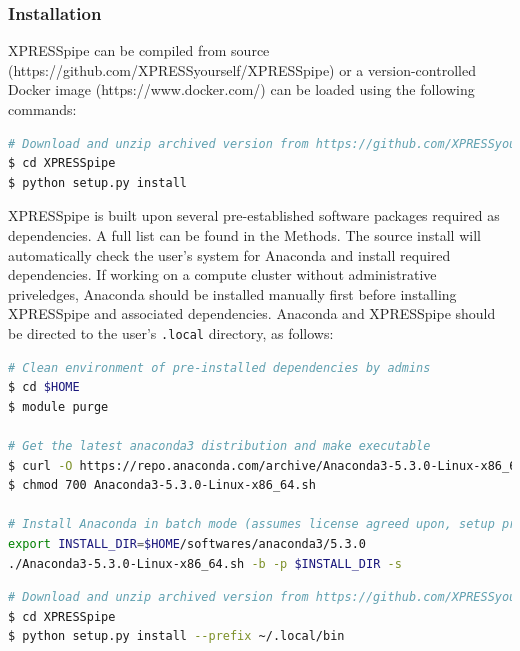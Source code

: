 \documentclass[11pt, a4paper, oneside]{article}
\begin{document}
\newline

\subsubsection{Installation}
XPRESSpipe can be compiled from source (https://github.com/XPRESSyourself/XPRESSpipe) or a version-controlled Docker image (https://www.docker.com/) can be loaded using the following commands: \par

\begin{lstlisting}[language=bash, caption=Source installation.]
# Download and unzip archived version from https://github.com/XPRESSyourself/XPRESSpipe/releases
$ cd XPRESSpipe
$ python setup.py install
\end{lstlisting}

XPRESSpipe is built upon several pre-established software packages required as dependencies. A full list can be found in the Methods. The source install will automatically check the user's system for Anaconda\cite{anaconda} and install required dependencies. If working on a compute cluster without administrative priveledges, Anaconda should be installed manually first before installing XPRESSpipe and associated dependencies. Anaconda and XPRESSpipe should be directed to the user's \texttt{.local} directory, as follows:

\begin{lstlisting}[language=bash, caption=Anaconda installation on compute node.]
# Clean environment of pre-installed dependencies by admins
$ cd $HOME
$ module purge

# Get the latest anaconda3 distribution and make executable
$ curl -O https://repo.anaconda.com/archive/Anaconda3-5.3.0-Linux-x86_64.sh
$ chmod 700 Anaconda3-5.3.0-Linux-x86_64.sh

# Install Anaconda in batch mode (assumes license agreed upon, setup prefix directory, and skip pre- and post- install scripts)
export INSTALL_DIR=$HOME/softwares/anaconda3/5.3.0
./Anaconda3-5.3.0-Linux-x86_64.sh -b -p $INSTALL_DIR -s
\end{lstlisting}


\begin{lstlisting}[language=bash, caption=Source installation on compute node.]
# Download and unzip archived version from https://github.com/XPRESSyourself/XPRESSpipe/releases
$ cd XPRESSpipe
$ python setup.py install --prefix ~/.local/bin
\end{lstlisting}
\end{document}
